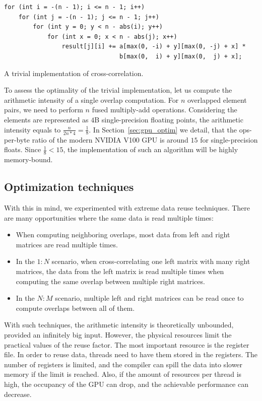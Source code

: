 \begin{listing}
\begin{verbatim}
for (int i = -(n - 1); i <= n - 1; i++)
    for (int j = -(n - 1); j <= n - 1; j++)
        for (int y = 0; y < n - abs(i); y++)
            for (int x = 0; x < n - abs(j); x++)
                result[j][i] += a[max(0, -i) + y][max(0, -j) + x] *
                                b[max(0,  i) + y][max(0,  j) + x];
\end{verbatim}
\caption{A trivial implementation of cross-correlation.}
\label{lst:cross}
\end{listing}

To assess the optimality of the trivial implementation, let us compute the arithmetic intensity of a single overlap computation. For $n$ overlapped element pairs, we need to perform $n$ fused multiply-add operations. Considering the elements are represented as $4$B single-precision floating points, the arithmetic intensity equals to $\frac{n}{2n * 4} = \frac{1}{8}$. In Section~\ref{sec:gpu_optim} we detail, that the ops-per-byte ratio of the modern NVIDIA V100 GPU is around $15$ for single-precision floats. Since $\frac{1}{8} < 15$, the implementation of such an algorithm will be highly memory-bound.

\subsection{Optimization techniques}

With this in mind, we experimented with extreme data reuse techniques. There are many opportunities where the same data is read multiple times:
\begin{itemize}
    \item When computing neighboring overlaps, most data from left and right matrices are read multiple times.
    \item In the $1:N$ scenario, when cross-correlating one left matrix with many right matrices, the data from the left matrix is read multiple times when computing the same overlap between multiple right matrices.
    \item In the $N:M$ scenario, multiple left and right matrices can be read once to compute overlaps between all of them.
\end{itemize}

With such techniques, the arithmetic intensity is theoretically unbounded, provided an infinitely big input. However, the physical resources limit the practical values of the reuse factor. The most important resource is the register file. In order to reuse data, threads need to have them stored in the registers. The number of registers is limited, and the compiler can spill the data into slower memory if the limit is reached. Also, if the amount of resources per thread is high, the occupancy of the GPU can drop, and the achievable performance can decrease.

